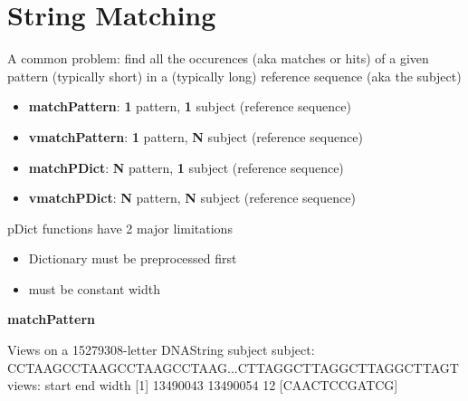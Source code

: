 \documentclass[pdf]{beamer}
\begin{document}
\section{String Matching}
\begin{frame}
A common problem: find all the occurences (aka matches or hits) of a given pattern (typically short) in a (typically long) reference sequence (aka the subject) 
\begin{itemize}
  \item \textbf{matchPattern}: \textbf{1} pattern, \textbf{1} subject (reference sequence)
  \item \textbf{vmatchPattern}: \textbf{1} pattern, \textbf{N} subject (reference sequence)
  \item \textbf{matchPDict}: \textbf{N} pattern, \textbf{1} subject (reference sequence)
  \item \textbf{vmatchPDict}: \textbf{N} pattern, \textbf{N} subject (reference sequence)
\end{itemize}
\alert{pDict functions have 2 major limitations}
\begin{itemize}
  \item Dictionary must be preprocessed first
  \item must be constant width
\end{itemize}
\end{frame}

\begin{frame}[fragile]
\textbf{matchPattern}
\begin{block}{}
\begin{footnotesize}
\begin{Schunk}
\begin{Soutput}
  Views on a 15279308-letter DNAString subject
subject: CCTAAGCCTAAGCCTAAGCCTAAG...CTTAGGCTTAGGCTTAGGCTTAGT
views:
       start      end width
[1] 13490043 13490054    12 [CAACTCCGATCG]
\end{Soutput}
\end{Schunk}
\end{footnotesize}
\end{block}
\end{frame}
\end{document}

